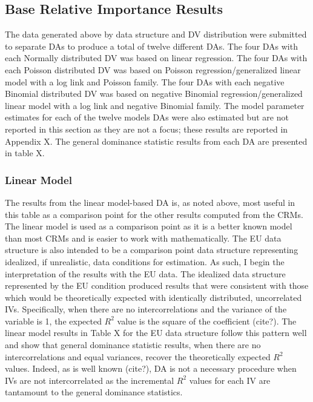 \documentclass[ShortAfour,times,sageapa]{sagej}
\begin{document}
	\subsection{Base Relative Importance Results}
	
	The data generated above by data structure and DV distribution were submitted to separate DAs to produce a total of twelve different DAs.
	The four DAs with each Normally distributed DV was based on linear regression.
	The four DAs with each Poisson distributed DV was based on Poisson regression/generalized linear model with a log link and Poisson family.
	The four DAs with each negative Binomial distributed DV was based on negative Binomial regression/generalized linear model with a log link and negative Binomial family.
	The model parameter estimates for each of the twelve models DAs were also estimated but are not reported in this section as they are not a focus; these results are reported in Appendix X. 
	The general dominance statistic results from each DA are presented in table X.
	
	
	
	
		\subsubsection{Linear Model}
	
	The results from the linear model-based DA is, as noted above, most useful in this table as a comparison point for the other results computed from the CRMs.
	The linear model is used as a comparison point as it is a better known model than most CRMs and is easier to work with mathematically.
	The EU data structure is also intended to be a comparison point data structure representing idealized, if unrealistic, data conditions for estimation.
	As such, I begin the interpretation of the results with the EU data.	
	The idealized data structure represented by the EU condition produced results that were consistent with those which would be theoretically expected with identically distributed, uncorrelated IVs.  
	Specifically, when there are no intercorrelations and the variance of the variable is 1, the expected $R^2$ value is the square of the coefficient (cite?).
	The linear model results in Table X for the EU data structure follow this pattern well and show that general dominance statistic results, when there are no intercorrelations and equal variances, recover the theoretically expected $R^2$ values.  
	Indeed, as is well known (cite?), DA is not a necessary procedure when IVs are not intercorrelated as the incremental $R^2$ values for each IV are tantamount to the general dominance statistics.
	
\end{document}
